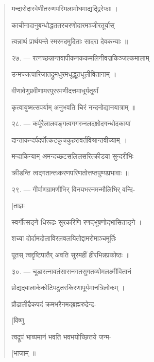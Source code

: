 \documentclass[a4paper, 11pt, oneside, french]{article}
\begin{document}
\begin{quotation}
\texthindi{मन्दारोदारवेणीतरुणपरिमलामोघमाद्यद्द्विरेफाः ।}

\texthindi{काचीनादानुबन्धोद्धततरचरणोदारमञ्जीरतूर्यास्}

\texthindi{त्वन्नाथं प्रार्थयन्ते स्मरमदमुदिताः सादरा देवकन्याः ॥}

\bigskip

\texthindi{२७}. --- \texthindi{रत्नच्छन्नान्तवापीकनककमलिनीवज्रकिञ्जल्कमालाम्}

\texthindi{उन्मज्जत्पारिजातद्रुमधुरमधूद्धूतधूलीवितानाम् ।}

\texthindi{वीणावेणुप्रवीणामरपुररमणीदत्तमाधूर्यतूर्यां}

\texthindi{कृत्वायुष्मत्सपर्याम् अनुभवति चिरं नन्दनोद्यानयात्राम् ॥}

\bigskip

\texthindi{२८}. --- \texthindi{कर्पूरैलालवङ्गत्वगगरुनलदक्षोदगन्धोदकायां}

\texthindi{दान्ताकन्दर्पदर्पोत्कटकुचकुहरावर्तविश्रान्तवीच्याम् ।}

\texthindi{मन्दाकिन्याम् अमन्दच्छटसलिलसरित्क्रीडया सुन्दरीभिः}

\texthindi{क्रीडन्ति त्वद्गतान्तःकरणपरिणतोत्तप्तपुण्यप्रभावाः ॥}

\bigskip

\texthindi{२९}. --- \texthindi{गीर्वाणग्रामणीभिर् विनयभरनमन्मौलिभिर् वन्दि-}

\hspace*{65mm}\texthindi{[ताज्ञः}

\texthindi{स्वर्गोत्सङ्गे धिरूढः सुरकरिणि रणद्भूषणोद्भासिताङ्गे ।}

\texthindi{शच्या दोर्दामदोलाविरलवलयितोद्दामरोमाञ्चमूर्तिः}

\texthindi{पूतस् त्वद्दृष्टिपातैर् अवति सुरमहीं हीरभिन्नप्रकोष्ठः ॥}

\bigskip

\texthindi{३०}. --- \texthindi{चूडारत्नावतंसासनगतसुगतव्योमलक्ष्मीवितानं}

\texthindi{प्रोद्यद्बालार्ककोटिपटुतरकिरणापूर्यमानत्रिलोकम् \texthindi{।}}

\texthindi{प्रौढालीढैकपदं क्रमभरैनमद्ब्रह्मरुद्रेन्द्र-}

\hspace*{65mm}\texthindi{[विष्णु}

\texthindi{त्वद्रूपं भाव्यमानं भवति भवभयोच्छित्तये जन्म-}

\hspace*{65mm}\texthindi{[भाजाम् ॥}

\bigskip


\end{quotation}
\end{document}
